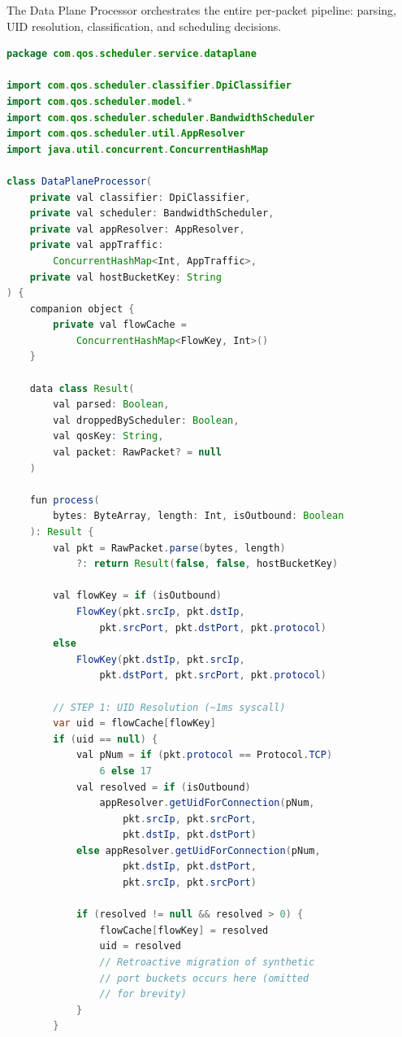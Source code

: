 The Data Plane Processor orchestrates the entire per-packet pipeline: parsing, UID resolution, classification, and scheduling decisions.

\begin{lstlisting}[language=Java, caption={DataPlaneProcessor.kt --- Pipeline orchestrator}, label={lst:dataplane}]
package com.qos.scheduler.service.dataplane

import com.qos.scheduler.classifier.DpiClassifier
import com.qos.scheduler.model.*
import com.qos.scheduler.scheduler.BandwidthScheduler
import com.qos.scheduler.util.AppResolver
import java.util.concurrent.ConcurrentHashMap

class DataPlaneProcessor(
    private val classifier: DpiClassifier,
    private val scheduler: BandwidthScheduler,
    private val appResolver: AppResolver,
    private val appTraffic:
        ConcurrentHashMap<Int, AppTraffic>,
    private val hostBucketKey: String
) {
    companion object {
        private val flowCache =
            ConcurrentHashMap<FlowKey, Int>()
    }

    data class Result(
        val parsed: Boolean,
        val droppedByScheduler: Boolean,
        val qosKey: String,
        val packet: RawPacket? = null
    )

    fun process(
        bytes: ByteArray, length: Int, isOutbound: Boolean
    ): Result {
        val pkt = RawPacket.parse(bytes, length)
            ?: return Result(false, false, hostBucketKey)

        val flowKey = if (isOutbound)
            FlowKey(pkt.srcIp, pkt.dstIp,
                pkt.srcPort, pkt.dstPort, pkt.protocol)
        else
            FlowKey(pkt.dstIp, pkt.srcIp,
                pkt.dstPort, pkt.srcPort, pkt.protocol)

        // STEP 1: UID Resolution (~1ms syscall)
        var uid = flowCache[flowKey]
        if (uid == null) {
            val pNum = if (pkt.protocol == Protocol.TCP)
                6 else 17
            val resolved = if (isOutbound)
                appResolver.getUidForConnection(pNum,
                    pkt.srcIp, pkt.srcPort,
                    pkt.dstIp, pkt.dstPort)
            else appResolver.getUidForConnection(pNum,
                    pkt.dstIp, pkt.dstPort,
                    pkt.srcIp, pkt.srcPort)

            if (resolved != null && resolved > 0) {
                flowCache[flowKey] = resolved
                uid = resolved
                // Retroactive migration of synthetic
                // port buckets occurs here (omitted
                // for brevity)
            }
        }


\end{lstlisting}

